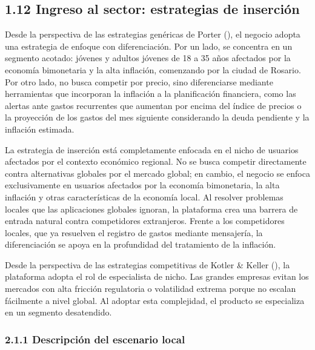 \subsection*{1.12 Ingreso al sector: estrategias de
inserción}\label{ingreso-al-sector-estrategias-de-inserciuxf3n}

Desde la perspectiva de las estrategias genéricas de Porter
(), el negocio adopta una estrategia de
enfoque con diferenciación. Por un lado, se concentra en un segmento
acotado: jóvenes y adultos jóvenes de 18 a 35 años afectados por la
economía bimonetaria y la alta inflación, comenzando por la ciudad de
Rosario. Por otro lado, no busca competir por precio, sino diferenciarse
mediante herramientas que incorporan la inflación a la planificación
financiera, como las alertas ante gastos recurrentes que aumentan por
encima del índice de precios o la proyección de los gastos del mes
siguiente considerando la deuda pendiente y la inflación estimada.

La estrategia de inserción está completamente enfocada en el nicho de
usuarios afectados por el contexto económico regional. No se busca
competir directamente contra alternativas globales por el mercado
global; en cambio, el negocio se enfoca exclusivamente en usuarios
afectados por la economía bimonetaria, la alta inflación y otras
características de la economía local. Al resolver problemas locales que
las aplicaciones globales ignoran, la plataforma crea una barrera de
entrada natural contra competidores extranjeros. Frente a los
competidores locales, que ya resuelven el registro de gastos mediante
mensajería, la diferenciación se apoya en la profundidad del tratamiento
de la inflación.

Desde la perspectiva de las estrategias competitivas de Kotler \& Keller
(), la plataforma adopta el rol de
especialista de nicho. Las grandes empresas evitan los mercados con alta
fricción regulatoria o volatilidad extrema porque no escalan fácilmente
a nivel global. Al adoptar esta complejidad, el producto se especializa
en un segmento desatendido.



\subsubsection*{2.1.1 Descripción del escenario
local}\label{descripciuxf3n-del-escenario-local}

